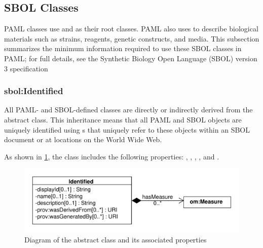 \subsection{SBOL Classes}

PAML classes use  and  as their root classes.
PAML also uses  to describe biological materials such as strains, reagents, genetic constructs, and media.
This subsection summarizes the minimum information required to use these SBOL classes in PAML; for full details, see the Synthetic Biology Open Language (SBOL) version 3 specification~\citep{SBOL3}

\subsubsection{sbol:Identified}
\label{sec:sbol:Identified}

All PAML- and SBOL-defined classes are directly or indirectly derived from the   abstract class.
This inheritance means that all PAML and SBOL objects are uniquely identified using s that uniquely refer to these objects within an SBOL document or at locations on the World Wide Web.

As shown in \ref{uml:identified}, the  class includes the following properties: ,  , , , and . 

\begin{figure}[ht]
\begin{center}
\includegraphics[scale=0.6]{sbol_classes/identified}
\caption[]{Diagram of the  abstract class and its associated properties}
\label{uml:identified}
\end{center}
\end{figure}

